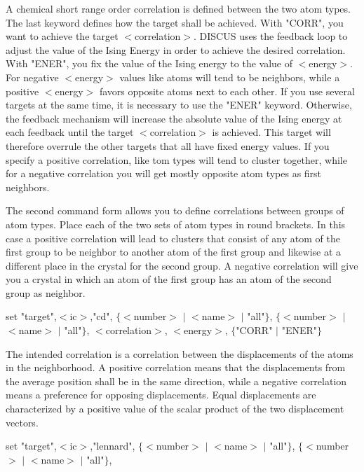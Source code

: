 \par
A chemical short range order correlation is defined 
between the two atom types. 
The last keyword defines how the target shall be achieved. 
With "CORR", you want to achieve the target $ <$correlation$> $. 
DISCUS uses the feedback loop to adjust the value of the 
Ising Energy in order to achieve the desired correlation. 
With "ENER", you fix the value of the Ising energy to the 
value of $ <$energy$> $. For negative $ <$energy$> $ values like atoms 
will tend to be neighbors, while a positive $ <$energy$> $ favors 
opposite atoms next to each other. 
If you use several targets at the same time, it is necessary to 
use the "ENER" keyword. Otherwise, the feedback mechanism will 
increase the absolute value of the Ising energy at each feedback 
until the target $ <$correlation$> $ is achieved. This target will 
therefore overrule the other targets that all have fixed energy 
values. 
If you specify a positive correlation, like tom types will tend to 
cluster together, while for a negative correlation you will get 
mostly opposite atom types as first neighbors. 
\par
The second command form allows you to define correlations between 
groups of atom types. Place each of the two sets of atom types 
in round brackets. In this case a positive correlation will 
lead to clusters that consist of any atom of the first group to be 
neighbor to another atom of the first group and likewise at a 
different place in the crystal for the second group. A negative 
correlation will give you a crystal in which an atom of the first 
group has an atom of the second group as neighbor. 
\par
set "target",$ <$ic$> $,"cd",   $ \{$$ <$number$> $ $| $ $ <$name$> $ $| $ "all"$\} $, 
                          $ \{$$ <$number$> $ $| $ $ <$name$> $ $| $ "all"$\} $, 
                          $ <$correlation$> $, $ <$energy$> $, $ \{$"CORR" $| $ "ENER"$\} $ 
\par
The intended correlation is a correlation between the displacements 
of the atoms in the neighborhood. A positive correlation means 
that the displacements from the average position shall be in the 
same direction, while a negative correlation means a preference 
for opposing displacements. 
Equal displacements are characterized by a positive value of the 
scalar product of the two displacement vectors. 
\par
\par
set "target",$ <$ic$> $,"lennard",  $ \{$$ <$number$> $ $| $ $ <$name$> $ $| $ "all"$\} $, 
                              $ \{$$ <$number$> $ $| $ $ <$name$> $ $| $ "all"$\} $, 
